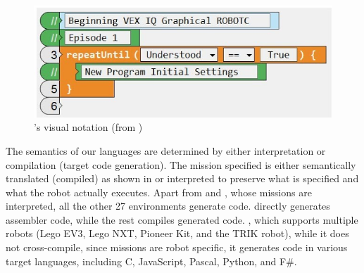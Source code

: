
\begin{figure}[t]
	\centering
		\includegraphics[width=\columnwidth]{robotc2.png}	\caption{\robotc's visual notation (from \cite{Admin})%
		}
	\label{fig:robotcgraphical}
\end{figure}




 The semantics of our languages are determined by either interpretation or compilation (target code generation). The mission specified is either semantically translated (compiled) as shown in  or interpreted to preserve what is specified and what the robot actually executes. Apart from \lego and \codelab, whose missions are interpreted, all the other 27 environments generate code. \metabot directly generates assembler code, while the rest compiles generated code. \trik, which supports multiple robots (Lego EV3, Lego NXT, Pioneer Kit, and the TRIK robot), while it does not cross-compile, since missions are robot specific, it generates code in various target languages, including C, JavaScript, Pascal, Python, and F\#.


